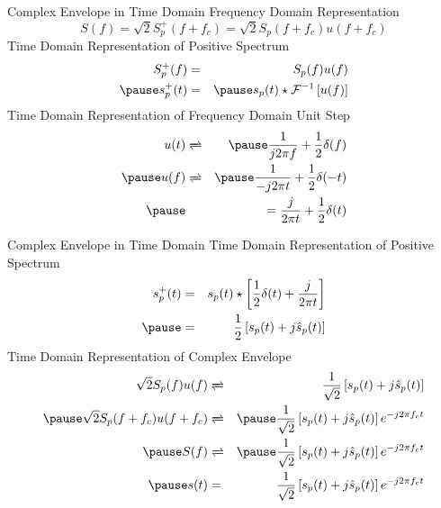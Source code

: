 \documentclass[t]{beamer}
\begin{document}
\begin{frame}{Complex Envelope in Time Domain}
Frequency Domain Representation
  \begin{equation*}
     S(f) = \sqrt{2} S_p^+(f+f_c) = \sqrt{2} S_p(f+f_c)u(f+f_c) 
  \end{equation*}
  \pause
  Time Domain Representation of Positive Spectrum
  \begin{eqnarray*}
     S_p^+(f) & = & S_p(f)u(f) \\
     \pause
     s_p^+(t) & = & \pause s_p(t) \star \mathcal{F}^{-1}\left[u(f)\right]
  \end{eqnarray*}
  \pause
  Time Domain Representation of Frequency Domain Unit Step
  \begin{eqnarray*}
     u(t) & \xrightleftharpoons{} & \pause \frac{1}{j2\pi f} + \frac{1}{2}\delta(f) \\
     \pause
     u(f) & \xrightleftharpoons{} & \pause \frac{1}{-j2\pi t} + \frac{1}{2}\delta(-t) \\
     \pause
          &  & = \frac{j}{2\pi t} + \frac{1}{2}\delta(t) 
  \end{eqnarray*}
\end{frame}

\begin{frame}{Complex Envelope in Time Domain}
  Time Domain Representation of Positive Spectrum
  \begin{eqnarray*}
     s_p^+(t) & = & s_p(t) \star \left[ \frac{1}{2}\delta(t) + \frac{j}{2\pi t}  \right] \\
     \pause   
              & = & \frac{1}{2} \left[ s_p(t) + j\hat{s}_p(t) \right]
  \end{eqnarray*}
  \pause 
  Time Domain Representation of Complex Envelope
  \begin{eqnarray*}
    \sqrt{2}S_p(f)u(f) & \xrightleftharpoons{} & \frac{1}{\sqrt{2}} \left[ s_p(t) + j\hat{s}_p(t) \right] \\
    \pause
    \sqrt{2}S_p(f+f_c)u(f+f_c) & \xrightleftharpoons{} & \pause \frac{1}{\sqrt{2}} \left[ s_p(t) + j\hat{s}_p(t) \right] e^{-j2\pi f_ct} \\
    \pause
    S(f) & \xrightleftharpoons{} & \pause \frac{1}{\sqrt{2}} \left[ s_p(t) + j\hat{s}_p(t) \right] e^{-j2\pi f_ct} \\
    \pause
    s(t) & = & \frac{1}{\sqrt{2}} \left[ s_p(t) + j\hat{s}_p(t) \right] e^{-j2\pi f_ct} 
  \end{eqnarray*}
\end{frame}
\end{document}
